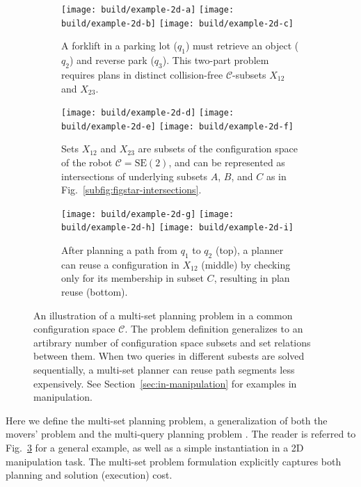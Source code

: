 \begin{figure}
\begin{widepage}
\begin{subfigure}[t]{.32\linewidth}
\centering
\texttt{[image: build/example-2d-a]}
\texttt{[image: build/example-2d-b]}
\texttt{[image: build/example-2d-c]}
\caption{A forklift in a parking lot ($q_1$)
  must retrieve an object ($q_2$)
  and reverse park ($q_3$).
  This two-part problem
  requires plans in distinct collision-free
  $\mathcal{C}$-subsets
  $X_{12}$ and $X_{23}$.}
\label{subfig:figstar-manip-probdef}
\end{subfigure}%
\quad%
\begin{subfigure}[t]{.32\linewidth}
\centering
\texttt{[image: build/example-2d-d]}
\texttt{[image: build/example-2d-e]}
\texttt{[image: build/example-2d-f]}
\caption{Sets $X_{12}$ and $X_{23}$ are subsets of
  the configuration space of the robot $\mathcal{C}=\mbox{SE}(2)$,
  and can be represented as intersections
  of underlying subsets $A$, $B$, and $C$
  as in Fig.~\ref{subfig:figstar-intersections}.}
\label{subfig:figstar-manip-spaces}
\end{subfigure}%
\quad%
\begin{subfigure}[t]{.32\linewidth}
\centering
\texttt{[image: build/example-2d-g]}
\texttt{[image: build/example-2d-h]}
\texttt{[image: build/example-2d-i]}
\caption{After planning a path from $q_1$ to $q_2$ (top),
  a planner can reuse a configuration in $X_{12}$ (middle)
  by checking only for its membership in subset $C$,
  resulting in plan reuse (bottom).}
\end{subfigure}

\caption{An illustration of a multi-set planning
  problem in a common configuration space $\mathcal{C}$.
  The problem definition generalizes to an artibrary number of
  configuration space subsets and set relations between them.
  When two queries in different subests are solved sequentially,
  a multi-set planner can reuse path segments less expensively.
  See Section~\ref{sec:in-manipulation} for examples in
  manipulation.}
\label{fig:multi-set}
\end{widepage}
\end{figure}

Here we define the multi-set planning problem,
a generalization of both the movers' problem
and the multi-query planning problem
\cite{kavrakietal1996prm}.
The reader is referred to
Fig.~\ref{fig:multi-set}
for a general example,
as well as a simple instantiation in a 2D manipulation task.
The multi-set problem formulation
explicitly captures both planning and
solution (execution) cost.

